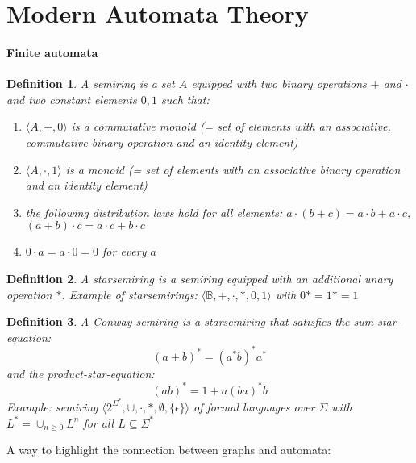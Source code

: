 \documentclass[]{article}
\newtheorem{definition}{Definition}
\begin{document}
\section{Modern Automata Theory}

\paragraph{Finite automata} 
\begin{definition}
    A semiring is a set $A$ equipped with two binary operations $+$ and $\cdot$ and two constant elements $0,1$ such that:
    \begin{enumerate}
        \item $\langle A, +, 0\rangle$ is a commutative monoid (= set of elements with an associative, commutative binary operation and an identity element)
        \item $\langle A, \cdot, 1\rangle$ is a monoid (= set of elements with an associative binary operation and an identity element)
        \item the following distribution laws hold for all elements: $a \cdot (b+c) = a \cdot b + a \cdot c$, $(a + b)\cdot c = a\cdot c + b\cdot c$
        \item $0\cdot a = a\cdot 0 = 0$ for every $a$
    \end{enumerate}
\end{definition}

\begin{definition}
    A starsemiring is a semiring equipped with an additional unary operation $*$. Example of starsemirings: $\langle \mathbb{B}, +, \cdot, *, 0, 1 \rangle$ with $0*=1*=1$
\end{definition}

\begin{definition}
    A Conway semiring is a starsemiring that satisfies the sum-star-equation:
    \begin{equation}
        (a+b)^* = (a^*b)^*a^*
    \end{equation}
     and the product-star-equation:
    \begin{equation}
        (ab)^* = 1 + a(ba)^*b
    \end{equation}
     Example: semiring $\langle 2^{\Sigma^*}, \cup, \cdot, *, \emptyset, \{ \epsilon \} \rangle$ of formal languages over $\Sigma$ with $L^*=\cup_{n\geq 0}L^n$ for all $L \subseteq \Sigma^*$
\end{definition}

A way to highlight the connection between graphs and automata:
\end{document}

